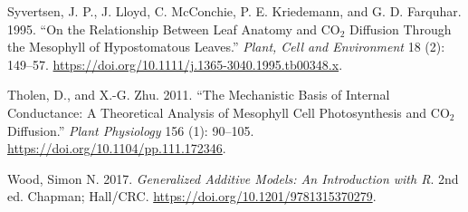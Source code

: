 \documentclass[
  letterpaper,
  DIV=11,
  numbers=noendperiod]{scrartcl}
\newlength{\cslhangindent}
\newlength{\cslentryspacingunit} %
\newenvironment{CSLReferences}[2] %
 {%
  \setlength{\parindent}{0pt}
  \ifodd #1
  \let\oldpar\par
  \def\par{\hangindent=\cslhangindent\oldpar}
  \fi
  \setlength{\parskip}{#2\cslentryspacingunit}
 }%
 {}
\begin{document}
\begin{CSLReferences}{1}{0}
\leavevmode{}%
Syvertsen, J. P., J. Lloyd, C. McConchie, P. E. Kriedemann, and G. D.
Farquhar. 1995. {``On the Relationship Between Leaf Anatomy and
{CO}\(_{\textrm{2}}\) Diffusion Through the Mesophyll of Hypostomatous
Leaves.''} \emph{Plant, Cell and Environment} 18 (2): 149--57.
\url{https://doi.org/10.1111/j.1365-3040.1995.tb00348.x}.

\leavevmode{}%
Tholen, D., and X.-G. Zhu. 2011. {``The Mechanistic Basis of Internal
Conductance: {A} Theoretical Analysis of Mesophyll Cell Photosynthesis
and {CO}\(_{\textrm{2}}\) Diffusion.''} \emph{Plant Physiology} 156 (1):
90--105. \url{https://doi.org/10.1104/pp.111.172346}.

\leavevmode{}%
Wood, Simon N. 2017. \emph{Generalized {Additive} {Models}: {An}
{Introduction} with {R}}. 2nd ed. Chapman; Hall/CRC.
\url{https://doi.org/10.1201/9781315370279}.

\end{CSLReferences}
\end{document}

